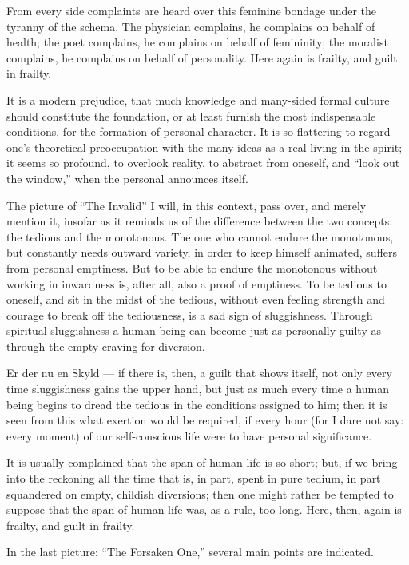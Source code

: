 \documentclass[12pt,a4paper]{book}
\begin{document}
From every side complaints are heard over this feminine bondage under the tyranny of the schema. The physician complains, he complains on behalf of health; the poet complains, he complains on behalf of femininity; the moralist complains, he complains on behalf of personality. Here again is frailty, and guilt in frailty.

It is a modern prejudice, that much knowledge and many-sided formal culture should constitute the foundation, or at least furnish the most indispensable conditions, for the formation of personal character. It is so flattering to regard one's theoretical preoccupation with the many ideas as a real living in the spirit; it seems so profound, to overlook reality, to abstract from oneself, and ``look out the window,'' when the personal announces itself.

The picture of ``The Invalid'' I will, in this context, pass over, and merely mention it, insofar as it reminds us of the difference between the two concepts: the tedious and the monotonous. The one who cannot endure the monotonous, but constantly needs outward variety, in order to keep himself animated, suffers from personal emptiness. But to be able to endure the monotonous without working in inwardness is, after all, also a proof of emptiness. To be tedious to oneself, and sit in the midst of the tedious, without even feeling strength and courage to break off the tediousness, is a sad sign of sluggishness. Through spiritual sluggishness a human being can become just as personally guilty as through the empty craving for diversion.

Er der nu en Skyld --- if there is, then, a guilt that shows itself, not only every time sluggishness gains the upper hand, but just as much every time
a human being begins to dread the tedious in the conditions assigned to him; then it is seen from this what exertion would be required, if every hour (for I dare not say: every moment) of our self-conscious life were to have personal significance.

It is usually complained that the span of human life is so short; but, if we bring into the reckoning all the time that is, in part, spent in pure tedium, in part squandered on empty, childish diversions; then one might rather be tempted to suppose that the span of human life was, as a rule, too long. Here, then, again is frailty, and guilt in frailty.

In the last picture: ``The Forsaken One,'' several main points are indicated.
\end{document}
